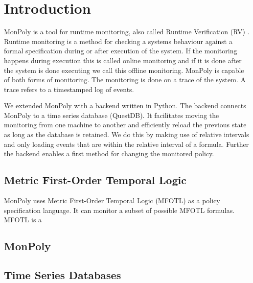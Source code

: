 \section{Introduction}

MonPoly \cite{Basin2017} is a tool for runtime monitoring, also called Runtime Verification (RV) \cite{Bartocci2018}.
Runtime monitoring is a method for checking a systems behaviour against a formal specification during or after execution of the system.
If the monitoring happens during execution this is called online monitoring and if it is done after the system is done executing we call this offline monitoring.
MonPoly is capable of both forms of monitoring.
The monitoring is done on a trace of the system.
A trace refers to a timestamped log of events.


We extended MonPoly with a backend written in Python. The backend connects MonPoly to a time series database (QuestDB).
It facilitates moving the monitoring from one machine to another and efficiently reload the previous state as long as the database is retained. 
We do this by making use of relative intervals and only loading events that are within the relative interval of a formula.
Further the backend enables a first method for changing the monitored policy.



\subsection{Metric First-Order Temporal Logic}
MonPoly uses Metric First-Order Temporal Logic (MFOTL) \cite{Basin2015, Chomicki1995} as a policy specification language. %
It can monitor a subset of possible MFOTL formulas.
MFOTL is a 

\subsection{MonPoly}

\subsection{Time Series Databases}

